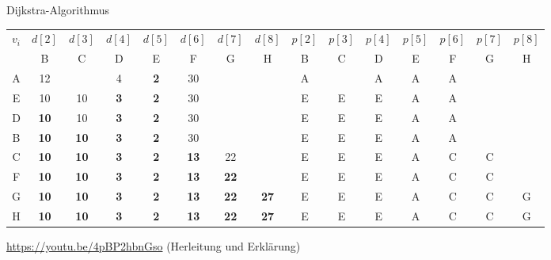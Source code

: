 \begin{example}{Dijkstra-Algorithmus}
\begin{center}
        \begin{tabular}{|c|ccccccc|ccccccc|}
            \hline
            \multirow{2}{*}{$v_i$} & $d[2]$      & $d[3]$      & $d[4]$     & $d[5]$     & $d[6]$      & $d[7]$      & $d[8]$      & $p[2]$ & $p[3]$ & $p[4]$ & $p[5]$ & $p[6]$ & $p[7]$ & $p[8]$ \\ \cline{2-15}
                                   & B           & C           & D          & E          & F           & G           & H           & B      & C      & D      & E      & F      & G      & H      \\
            \hline
            A                      & 12          &             & 4          & \textbf{2} & 30          &             &             & A      &        & A      & A      & A      &        &        \\
            E                      & 10          & 10          & \textbf{3} & \textbf{2} & 30          &             &             & E      & E      & E      & A      & A      &        &        \\
            D                      & \textbf{10} & 10          & \textbf{3} & \textbf{2} & 30          &             &             & E      & E      & E      & A      & A      &        &        \\
            B                      & \textbf{10} & \textbf{10} & \textbf{3} & \textbf{2} & 30          &             &             & E      & E      & E      & A      & A      &        &        \\
            C                      & \textbf{10} & \textbf{10} & \textbf{3} & \textbf{2} & \textbf{13} & 22          &             & E      & E      & E      & A      & C      & C      &        \\
            F                      & \textbf{10} & \textbf{10} & \textbf{3} & \textbf{2} & \textbf{13} & \textbf{22} &             & E      & E      & E      & A      & C      & C      &        \\
            G                      & \textbf{10} & \textbf{10} & \textbf{3} & \textbf{2} & \textbf{13} & \textbf{22} & \textbf{27} & E      & E      & E      & A      & C      & C      & G      \\
            H                      & \textbf{10} & \textbf{10} & \textbf{3} & \textbf{2} & \textbf{13} & \textbf{22} & \textbf{27} & E      & E      & E      & A      & C      & C      & G      \\
            \hline
        \end{tabular}
    \end{center}

    \vspace{1em}

    \url{https://youtu.be/4pBP2hbnGso} (Herleitung und Erklärung)
\end{example}


